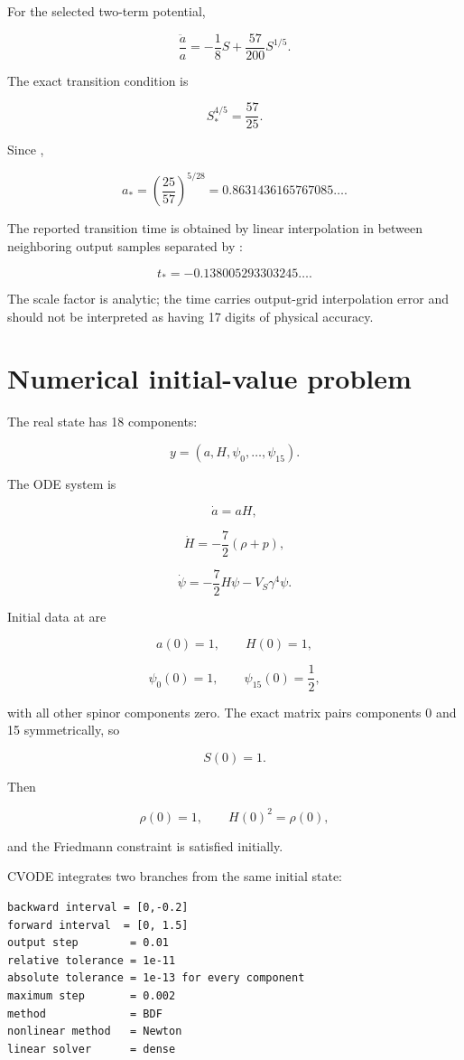 \documentclass[11pt]{article}
\begin{document}
For the selected two-term potential,

\[
\frac{\ddot a}{a}
=-\frac18S+\frac{57}{200}S^{1/5}.
\]

The exact transition condition is

\[
S_*^{4/5}=\frac{57}{25}.
\]

Since \texttt{},

\[
\boxed{
a_*=\left(\frac{25}{57}\right)^{5/28}
=0.8631436165767085\ldots.}
\]

The reported transition time is obtained by linear interpolation in \texttt{} between neighboring output samples separated by \texttt{}:

\[
t_*=-0.138005293303245\ldots.
\]

The scale factor is analytic; the time carries output-grid interpolation error and should not be interpreted as having 17 digits of physical accuracy.

\section{Numerical initial-value problem}

The real state has 18 components:

\[
y=(a,H,\psi_0,\ldots,\psi_{15}).
\]

The ODE system is

\[
\dot a=aH,
\]

\[
\dot H=-\frac72(\rho+p),
\]

\[
\dot\psi=-\frac72H\psi-V_S\gamma^4\psi.
\]

Initial data at \texttt{} are

\[
a(0)=1,
\qquad H(0)=1,
\]

\[
\psi_0(0)=1,
\qquad \psi_{15}(0)=\frac12,
\]

with all other spinor components zero. The exact matrix \texttt{} pairs components 0 and 15 symmetrically, so

\[
S(0)=1.
\]

Then

\[
\rho(0)=1,
\qquad H(0)^2=\rho(0),
\]

and the Friedmann constraint is satisfied initially.

CVODE integrates two branches from the same initial state:

\begin{Verbatim}[fontsize=\small]
backward interval = [0,-0.2]
forward interval  = [0, 1.5]
output step        = 0.01
relative tolerance = 1e-11
absolute tolerance = 1e-13 for every component
maximum step       = 0.002
method             = BDF
nonlinear method   = Newton
linear solver      = dense
\end{Verbatim}
\end{document}
